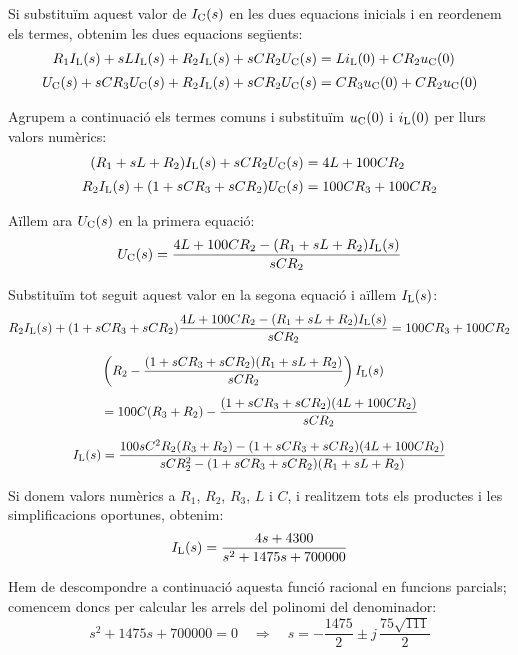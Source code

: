 \begin{exemple}
    Si substituïm aquest valor de $I_\mathrm{C}(s)$ en les dues equacions
    inicials i en reordenem els termes, obtenim les dues equacions següents:
    \begin{align*}
        R_1 I_\mathrm{L}(s) + s L I_\mathrm{L}(s)  + R_2
        I_\mathrm{L}(s) + s C R_2 U_\mathrm{C}(s) &= L i_\mathrm{L}(0) + C R_2 u_\mathrm{C}(0)\\[0.5ex]
        U_\mathrm{C}(s) + s C R_3 U_\mathrm{C}(s) + R_2 I_\mathrm{L}(s) + s C R_2 U_\mathrm{C}(s)
        &= C R_3 u_\mathrm{C}(0) + C R_2 u_\mathrm{C}(0)
    \end{align*}

    Agrupem a continuació els termes comuns i substituïm $u_\mathrm{C}(0)$ i
    $i_\mathrm{L}(0)$ per llurs valors numèrics:
    \begin{align*}
        (R_1 + s L + R_2) I_\mathrm{L}(s) + s C R_2 U_\mathrm{C}(s) &= 4 L  + 100 C R_2\\[0.5ex]
        R_2 I_\mathrm{L}(s) + (1 +s C R_3 + s C R_2) U_\mathrm{C}(s) &= 100 C R_3  + 100 C R_2
    \end{align*}

    Aïllem ara $U_\mathrm{C}(s)$ en la primera equació:
    \[
        U_\mathrm{C}(s) = \frac{4 L  + 100 C R_2 -(R_1 + s L + R_2) I_\mathrm{L}(s)}{s C R_2}
    \]

    Substituïm tot seguit aquest valor en la segona equació i aïllem
    $I_\mathrm{L}(s)$:
    \begin{gather*}
       R_2 I_\mathrm{L}(s) + (1 + s C R_3 + s C R_2) \frac{4 L  + 100 C R_2 - (R_1 + s L + R_2)I_\mathrm{L}(s)}{s C R_2} = 100 C R_3  + 100 C R_2 \\[1.5ex]
       \begin{split} &\left( R_2 - \frac{(1 +s C R_3 + s C R_2)(R_1 + s L + R_2)}{s C R_2} \right) I_\mathrm{L}(s)
        \\[1ex] &= 100 C (R_3  + R_2) - \frac{(1 +s C R_3 + s C R_2)(4 L  + 100 C R_2)}{s C
       R_2}\end{split}\\[1.5ex]
    I_\mathrm{L}(s) = \frac{100 s C^2 R_2(R_3  + R_2)- (1 +s C R_3 + s C
    R_2)(4 L  + 100 C R_2)}{s C R_2^2  -(1 +s C R_3 + s C R_2)(R_1 + s L
    + R_2)}
    \end{gather*}

    Si donem valors numèrics a $R_1$, $R_2$, $R_3$, $L$ i $C$, i
    realitzem tots els productes i les  simplificacions oportunes,
    obtenim:
    \[
    I_\mathrm{L}(s) = \frac{4 s+ 4300}{s^2 +1475 s + 700000}
    \]

    Hem de descompondre a continuació aquesta funció racional en
    funcions parcials; comencem doncs per calcular les arrels del
    polinomi del denominador:
    \[
    s^2 +1475 s + 700000 = 0 \quad\Rightarrow\quad s= -\frac{1475}{2}
    \pm j\,\frac{75\sqrt{111}}{2}
    \]


\end{exemple}

